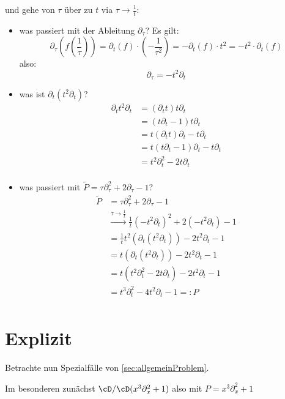 und gehe von $\tau$ über zu $t$ via $\tau\rightarrow\frac{1}{t}$:\\
\begin{itemize}
\item was passiert mit der Ableitung $\partial_\tau$? Es gilt:
\[
\partial_\tau (f(\frac{1}{\tau}))=
\partial_t(f)\cdot (-\frac{1}{\tau^2})=
-\partial_t(f)\cdot t^2= %
- t^2 \cdot \partial_t(f)
\]
also:
\[
\partial_\tau=-t^2\partial_t
\]
\item was ist $\partial_t(t^2\partial_t)$?
\begin{align*}
\partial_tt^2\partial_t &= (\partial_tt)t\partial_t\\
&= (t\partial_t-1)t\partial_t\\
&= t(\partial_tt)\partial_t-t\partial_t\\
&= t(t\partial_t-1)\partial_t-t\partial_t\\
&= t^2\partial_t^2-2t\partial_t\\
\end{align*}
\item was passiert mit $ \tilde P=\tau\partial_\tau^2+2\partial_\tau-1 $?
\begin{align*}
\tilde P &= \tau\partial_\tau^2+2\partial_\tau-1\\
&\overset{\tau\rightarrow\frac{1}{t}}{\longrightarrow}
\frac{1}{t}(-t^2\partial_t)^2+2(-t^2\partial_t)-1\\
&= \frac{1}{t}t^2(\partial_t(t^2\partial_t))-2t^2\partial_t-1\\
&= t(\partial_t(t^2\partial_t))-2t^2\partial_t-1\\
&= t(t^2\partial_t^2-2t\partial_t)-2t^2\partial_t-1\\
&= t^3\partial_t^2-4t^2\partial_t-1 =: P\\
\end{align*}
\end{itemize}

\section{Explizit}
Betrachte nun Spezialfälle von \ref{sec:allgemeinProblem}.

Im besonderen zunächst $\cD/\cD(x^3\partial_x^2+1)$ also mit
$P=x^3\partial_x^2+1$

